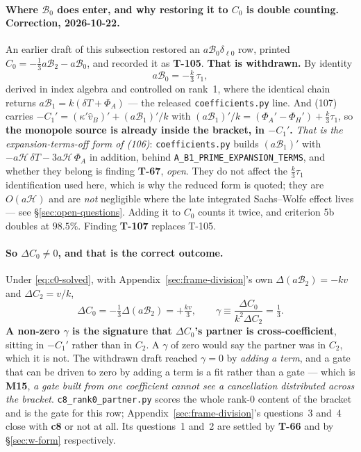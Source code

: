 \paragraph{Where $\mathcal B_0$ does enter, and why restoring it to $C_0$ is
double counting. \textnormal{\textbf{Correction, 2026-10-22.}}} An earlier
draft of this subsection restored an $a\mathcal B_0\delta_{\ell0}$ row,
printed $C_0=-\tfrac13a\mathcal B_2-a\mathcal B_0$, and recorded it as
\textbf{T-105}. \textbf{That is withdrawn.} By identity
\begin{equation}
  a\mathcal B_0=-\tfrac{k}{3}\,\tau_1 ,
\end{equation}
derived in index algebra and controlled on rank~1, where the identical chain
returns $a\mathcal B_1=k(\delta T+\Phi_A)$ --- the released
\texttt{coefficients.py} line. And (107) carries
$-C_1'=(\kappa'\hat v_B)'+(a\mathcal B_1)'/k$ with
$(a\mathcal B_1)'/k=(\Phi_A'-\Phi_H')+\tfrac k3\tau_1$, so
\textbf{the monopole source is already inside the bracket, in $-C_1'$.}
\emph{That is the expansion-terms-off form of (106)}:
\texttt{coefficients.py} builds $(a\mathcal B_1)'$ with
$-a\mathcal H\,\delta T-3a\mathcal H\,\Phi_A$ in addition, behind
\texttt{A\_B1\_PRIME\_EXPANSION\_TERMS}, and whether they belong is finding
\textbf{T-67}, \emph{open}. They do not affect the $\tfrac k3\tau_1$
identification used here, which is why the reduced form is quoted; they are
$O(a\mathcal H)$ and are \emph{not} negligible where the late integrated
Sachs--Wolfe effect lives --- see \S\ref{sec:open-questions}.
Adding it to $C_0$ counts it twice, and criterion 5b doubles at $98.5\%$.
Finding \textbf{T-107} replaces T-105.

\paragraph{So $\Delta C_0\neq0$, and that is the correct outcome.} Under
\eqref{eq:c0-solved}, with Appendix~\ref{sec:frame-division}'s own
$\Delta(a\mathcal B_2)=-kv$ and $\Delta C_2=v/k$,
\begin{equation}
  \Delta C_0=-\tfrac13\Delta(a\mathcal B_2)=+\tfrac{kv}{3},
  \qquad
  \gamma\equiv\frac{\Delta C_0}{k^2\Delta C_2}=\tfrac13 .
\end{equation}
\textbf{A non-zero $\gamma$ is the signature that $\Delta C_0$'s partner is
cross-coefficient}, sitting in $-C_1'$ rather than in $C_2$. A $\gamma$ of
zero would say the partner was in $C_2$, which it is not. The withdrawn draft
reached $\gamma=0$ by \emph{adding a term}, and a gate that can be driven to
zero by adding a term is a fit rather than a gate --- which is \textbf{M15},
\emph{a gate built from one coefficient cannot see a cancellation distributed
across the bracket}. \texttt{c8\_rank0\_partner.py} scores the whole rank-0
content of the bracket and is the gate for this row;
Appendix~\ref{sec:frame-division}'s questions~3 and~4 close with \textbf{c8} or
not at all. Its questions~1 and~2 are settled by \textbf{T-66} and by
\S\ref{sec:w-form} respectively.

